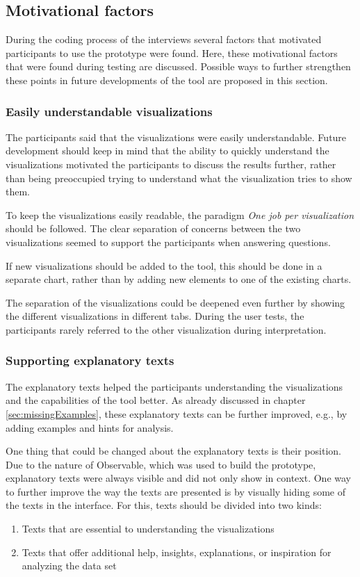 \subsection{Motivational factors}
During the coding process of the interviews several factors that motivated participants to use the prototype were found. Here, these motivational factors that were found during testing are discussed. Possible ways to further strengthen these points in future developments of the tool are proposed in this section.

\subsubsection*{Easily understandable visualizations}
The participants said that the visualizations were easily understandable. Future development should keep in mind that the ability to quickly understand the visualizations motivated the participants to discuss the results further, rather than being preoccupied trying to understand what the visualization tries to show them.

To keep the visualizations easily readable, the paradigm \emph{One job per visualization} should be followed. The clear separation of concerns between the two visualizations seemed to support the participants when answering questions. 

If new visualizations should be added to the tool, this should be done in a separate chart, rather than by adding new elements to one of the existing charts.

The separation of the visualizations could be deepened even further by showing the different visualizations in different tabs. During the user tests, the participants rarely referred to the other visualization during interpretation.

\subsubsection*{Supporting explanatory texts}
The explanatory texts helped the participants understanding the visualizations and the capabilities of the tool better. As already discussed in chapter \ref{sec:missingExamples}, these explanatory texts can be further improved, e.g., by adding examples and hints for analysis.

One thing that could be changed about the explanatory texts is their position. Due to the nature of Observable, which was used to build the prototype, explanatory texts were always visible and did not only show in context. One way to further improve the way the texts are presented is by visually hiding some of the texts in the interface. For this, texts should be divided into two kinds:
\begin{enumerate}
    \item Texts that are essential to understanding the visualizations
    \item Texts that offer additional help, insights, explanations, or inspiration for analyzing the data set
\end{enumerate}

